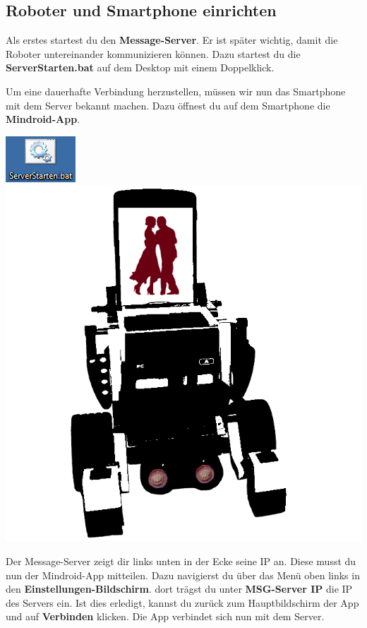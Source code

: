 \documentclass[
	12pt,
	article,
	type=bsc, %
	colorbacktitle,
	instlogo,
	accentcolor=tud1c,
	german,
	twoside
]{tudexercise}
\newcommand{\td}[1]{
	\todo[inline]{#1}
	}
\begin{document}
	\subsection{Roboter und Smartphone einrichten}
	\begin{enumerate}
		\begin{minipage} {.5\textwidth}
	\item Als erstes startest du den \textbf{Message-Server}. Er ist später wichtig, damit die Roboter untereinander kommunizieren können. Dazu startest du die \textbf{ServerStarten.bat} auf dem Desktop mit einem Doppelklick. 
	\item Um eine dauerhafte Verbindung herzustellen, müssen wir nun das Smartphone mit dem Server bekannt machen. Dazu öffnest du auf dem Smartphone die \textbf{Mindroid-App}. 
	\end{minipage}
	\begin{minipage} {.5\textwidth}
	\includegraphics[width=.4\textwidth]{img/serverstartenbat.png}
	\includegraphics[width=.5\textwidth]{img/MindrobotWithTango}
	\end{minipage}
	\item Der Message-Server zeigt dir links unten in der Ecke seine IP an. Diese musst du nun der Mindroid-App mitteilen. Dazu navigierst du über das Menü oben links in den \textbf{Einstellungen-Bildschirm}. \td{Einstellungen Bild} dort trägst du unter \textbf{MSG-Server IP} die IP des Servers ein. Ist dies erledigt, kannst du zurück zum Hauptbildschirm der App und auf \textbf{Verbinden} klicken. Die App verbindet sich nun mit dem Server.

\end{enumerate}
\end{document}
